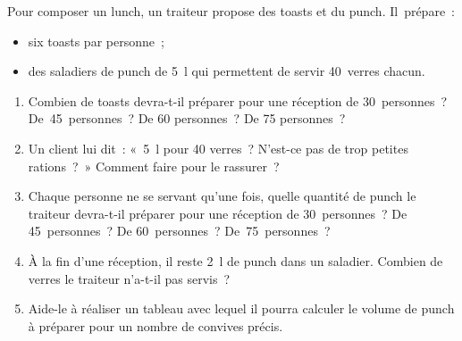 \begin{activite}[Et pour un ?]

Pour composer un lunch, un traiteur propose des toasts et du punch. Il prépare :
\begin{itemize}
 \item six toasts par personne ;
 \item des saladiers de punch de 5 l qui permettent de servir 40 verres chacun.
 \end{itemize}
 \begin{enumerate}
  \item Combien de toasts devra-t-il préparer pour une réception de 30 personnes ? De 45 personnes ? De 60 personnes ? De 75 personnes ?
  \item Un client lui dit : « 5 l pour 40 verres ? N'est-ce pas de trop petites rations ? » Comment faire pour le rassurer ?
  \item Chaque personne ne se servant qu’une fois, quelle quantité de punch le traiteur devra-t-il préparer pour une réception de 30 personnes ? De 45 personnes ? De 60 personnes ? De 75 personnes ?
  \item À la fin d’une réception, il reste 2 l de punch dans un saladier. Combien de verres le traiteur n’a-t-il pas servis ?
  \item Aide-le à réaliser un tableau avec lequel il pourra calculer le volume de punch à préparer pour un nombre de convives précis.
  \end{enumerate}

\end{activite}



